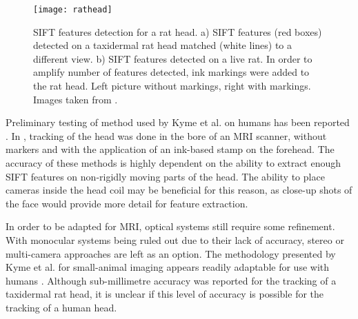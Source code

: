 \documentclass[class=article, crop=false]{standalone}
\begin{document}
\begin{figure}
	\centering
	\texttt{[image: rathead]}
	\caption{SIFT features detection for a rat head. a) SIFT features (red boxes) detected on a taxidermal rat head matched (white lines) to a different view. b) SIFT features detected on a live rat. In order to amplify number of features detected, ink markings were added to the rat head. Left picture without markings, right with markings. Images taken from \parencite{Kyme2014}.}
	\label{rathead}
\end{figure}

\par 
Preliminary testing of method used by Kyme et al. \parencite*{Kyme2014} on humans has been reported \parencite{Kyme2016,Kyme2013}. In \cite{Kyme2016}, tracking of the head was done in the bore of an MRI scanner, without markers and with the application of an ink-based stamp on the forehead. The accuracy of these methods is highly dependent on the ability to extract enough SIFT features on non-rigidly moving parts of the head. The ability to place cameras inside the head coil may be beneficial for this reason, as close-up shots of the face would provide more detail for feature extraction.
\par 
In order to be adapted for MRI, optical systems still require some refinement. With monocular systems being ruled out due to their lack of accuracy, stereo or multi-camera approaches are left as an option. The methodology presented by Kyme et al. \parencite*{Kyme2014} for small-animal imaging appears readily adaptable for use with humans \parencite{Kyme2016,Kyme2013}. Although sub-millimetre accuracy was reported for the tracking of a taxidermal rat head, it is unclear if this level of accuracy is possible for the tracking of a human head.
\end{document}
